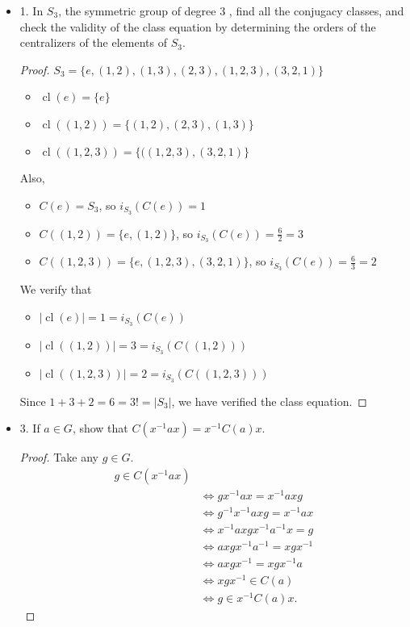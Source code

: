 \begin{itemize}[resume]
	\item 1. In $S_3$, the symmetric group of degree 3 , find all the conjugacy classes, and check the validity of the class equation by determining the orders of the centralizers of the elements of $S_3$.
\begin{proof}
	$S_3 = \{e, (1,2),(1,3), (2,3), (1,2,3), (3,2,1)\} $
	 \begin{itemize}
		 \item $\operatorname{cl}(e) = \{e\} $
		 \item $\operatorname{cl}((1,2)) = \{(1,2), (2,3), (1,3)\} $
		 \item $\operatorname{cl}((1,2,3)) = \{((1,2,3), (3,2,1)\} $
	 \end{itemize}
	 Also,
	 \begin{itemize}
	 	\item $C(e) = S_3$, so $i_{S_3}(C(e)) = 1$
	 	\item $C((1,2)) = \{e, (1,2)\} $, so $i_{S_3}(C(e)) = \frac{6}{2} = 3$
	 	\item $C((1,2,3)) = \{e, (1,2,3),(3,2,1)\} $, so $i_{S_3}(C(e)) = \frac{6}{3} = 2$
	 \end{itemize}
	 We verify that
	 \begin{itemize}
	 	\item $\left| \operatorname{cl}(e) \right|  =  1 = i_{S_3}(C(e))$
	 	\item $\left| \operatorname{cl}((1,2)) \right|  =  3 = i_{S_3}(C((1,2)))$
	 	\item $\left| \operatorname{cl}((1,2,3)) \right|  = 2  = i_{S_3}(C((1,2,3)))$
	 \end{itemize}
	 Since $1 + 3 + 2 = 6 = 3! = |S_3|$, we have verified the class equation.
\end{proof}

	\item 3. If $a \in G$, show that $C\left(x^{-1} a x\right)=x^{-1} C(a) x$.
\begin{proof}
	Take any $g \in G$.
	\begin{align*}
		g \in C(x^{-1} ax) \\
		&\iff g x^{-1} a x = x^{-1} a x g \\
		&\iff g^{-1} x^{-1} a x g = x^{-1}  a x \\
		&\iff x^{-1} a x g x^{-1}  a^{-1} x = g \\
		&\iff a  x g x^{-1} a^{-1} = x g x^{-1} \\
		&\iff a x g x^{-1}  = x g x^{-1} a \\
		&\iff  x g x^{-1}  \in C(a) \\
		&\iff g \in x^{-1}  C(a) x 
	.\end{align*}
\end{proof}


\end{itemize}
